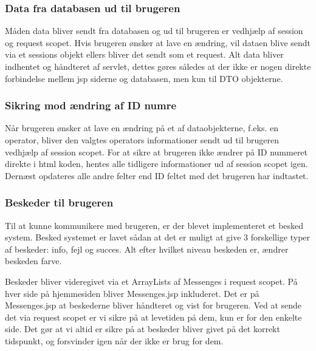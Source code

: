 \documentclass[a4paper]{article}
\begin{document}
\subsubsection*{Data fra databasen ud til brugeren} %

Måden data bliver sendt fra databasen og ud til brugeren er vedhjælp af session og request scopet. Hvis brugeren ønsker at lave en ændring, vil dataen blive sendt via et sessions objekt ellers bliver det sendt som et request.  Alt data bliver indhentet og håndteret af servlet, dettes gøres således at der ikke er nogen direkte forbindelse mellem jsp siderne og databasen, men kun til DTO objekterne.   


\subsubsection*{Sikring mod ændring af ID numre} %

Når brugeren ønsker at lave en ændring på et af dataobjekterne, f.eks. en operator, bliver den valgtes operators informationer sendt ud til brugeren vedhjælp af session scopet. For at sikre at brugeren ikke ændrer på ID nummeret direkte i html koden, hentes alle tidligere informationer ud af session scopet igen.  Dernæst opdateres alle andre felter end ID feltet med det brugeren har indtastet.


\subsubsection*{Beskeder til brugeren} %

Til at kunne kommunikere med brugeren, er der blevet implementeret et besked system. Besked systemet er lavet sådan at det er muligt at give 3 forskellige typer af beskeder: info, fejl og succes. Alt efter hvilket niveau beskeden er, ændrer beskeden farve.

Beskeder bliver videregivet via et ArrayLists af Messenges i request scopet. På hver side på hjemmesiden bliver Messenges.jsp inkluderet. Det er på Messenges.jsp at beskederne bliver håndteret og vist for brugeren. Ved at sende det via request scopet er vi sikre på at levetiden på dem, kun er for den enkelte side. Det gør at vi altid er sikre på at beskeder bliver givet på det korrekt tidspunkt, og forsvinder igen når der ikke er brug for dem.
\end{document}
